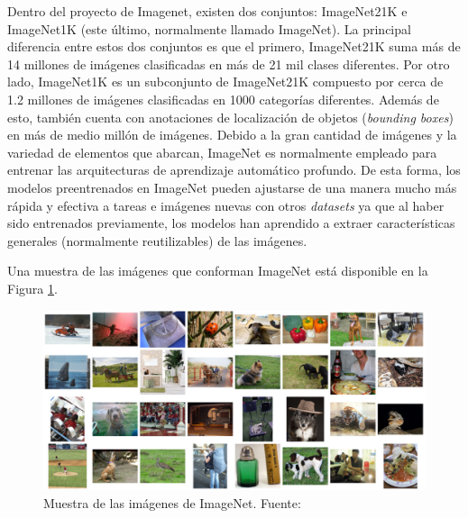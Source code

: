 Dentro del proyecto de Imagenet, existen dos conjuntos: ImageNet21K e ImageNet1K (este último, normalmente llamado ImageNet). La principal diferencia entre estos dos conjuntos es que el primero, ImageNet21K suma más de 14 millones de imágenes clasificadas en más de 21 mil clases diferentes. Por otro lado, ImageNet1K es un subconjunto de ImageNet21K compuesto por cerca de 1.2 millones de imágenes clasificadas en 1000 categorías diferentes. Además de esto, también cuenta con anotaciones de localización de objetos (\textit{bounding boxes}) en más de medio millón de imágenes. Debido a la gran cantidad de imágenes y la variedad de elementos que abarcan, ImageNet es normalmente empleado para entrenar las arquitecturas de aprendizaje automático profundo. De esta forma, los modelos preentrenados en ImageNet pueden ajustarse de una manera mucho más rápida y efectiva a tareas e imágenes nuevas con otros \textit{datasets} ya que al haber sido entrenados previamente, los modelos han aprendido a extraer características generales (normalmente reutilizables) de las imágenes.

Una muestra de las imágenes que conforman ImageNet está disponible en la Figura \ref{fig:imagenet}.
\begin{figure}[H]
\centering
\includegraphics[width=\textwidth]{imagenes/imagenet.png}
\caption{Muestra de las imágenes de ImageNet. Fuente: \cite{ILSVRC15}}
\label{fig:imagenet}
\end{figure}

